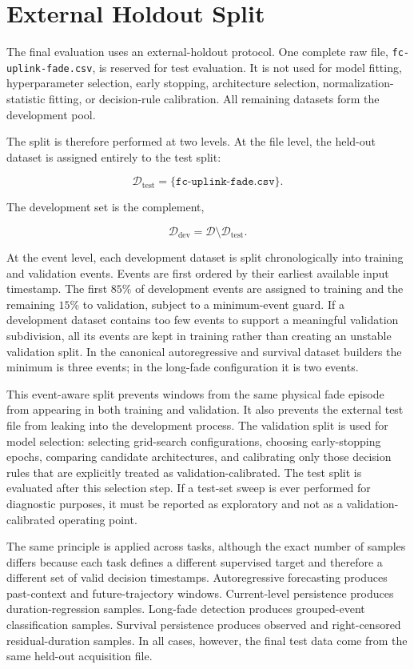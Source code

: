 \section{External Holdout Split}

The final evaluation uses an external-holdout protocol. One complete raw file,
\texttt{fc-uplink-fade.csv}, is reserved for test evaluation. It is not used for
model fitting, hyperparameter selection, early stopping, architecture selection,
normalization-statistic fitting, or decision-rule calibration. All remaining
datasets form the development pool.

The split is therefore performed at two levels. At the file level, the held-out
dataset is assigned entirely to the test split:

\[
  \mathcal{D}_{\text{test}} = \{\texttt{fc-uplink-fade.csv}\}.
\]

The development set is the complement,

\[
  \mathcal{D}_{\text{dev}} = \mathcal{D}\setminus\mathcal{D}_{\text{test}}.
\]

At the event level, each development dataset is split chronologically into
training and validation events. Events are first ordered by their earliest
available input timestamp. The first \(85\%\) of development events are assigned
to training and the remaining \(15\%\) to validation, subject to a minimum-event
guard. If a development dataset contains too few events to support a meaningful
validation subdivision, all its events are kept in training rather than creating
an unstable validation split. In the canonical autoregressive and survival
dataset builders the minimum is three events; in the long-fade configuration it
is two events.

This event-aware split prevents windows from the same physical fade episode from
appearing in both training and validation. It also prevents the external test
file from leaking into the development process. The validation split is used for
model selection: selecting grid-search configurations, choosing early-stopping
epochs, comparing candidate architectures, and calibrating only those decision
rules that are explicitly treated as validation-calibrated. The test split is
evaluated after this selection step. If a test-set sweep is ever performed for
diagnostic purposes, it must be reported as exploratory and not as a
validation-calibrated operating point.

The same principle is applied across tasks, although the exact number of samples
differs because each task defines a different supervised target and therefore a
different set of valid decision timestamps. Autoregressive forecasting produces
past-context and future-trajectory windows. Current-level persistence produces
duration-regression samples. Long-fade detection produces grouped-event
classification samples. Survival persistence produces observed and right-censored
residual-duration samples. In all cases, however, the final test data come from
the same held-out acquisition file.

